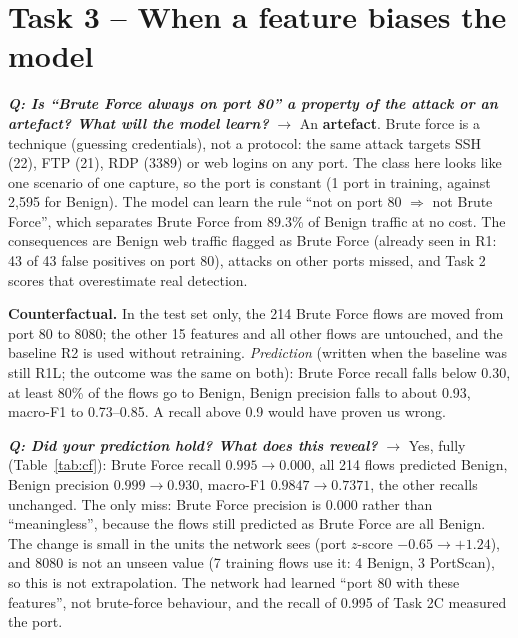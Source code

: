 \documentclass[9pt]{extarticle}
\newcommand{\Q}[1]{\textbf{\emph{Q: #1}}}
\newcommand{\run}[1]{\textsf{#1}}
\begin{document}
\section{Task 3 -- When a feature biases the model}

\Q{Is ``Brute Force always on port 80'' a property of the attack or an artefact? What will the model learn?} $\rightarrow$ An \textbf{artefact}. Brute force is a technique (guessing credentials), not a protocol: the same attack targets SSH (22), FTP (21), RDP (3389) or web logins on any port. The class here looks like one scenario of one capture, so the port is constant (1 port in training, against 2,595 for Benign). The model can learn the rule ``not on port 80 $\Rightarrow$ not Brute Force'', which separates Brute Force from 89.3\% of Benign traffic at no cost. The consequences are Benign web traffic flagged as Brute Force (already seen in \run{R1}: 43 of 43 false positives on port 80), attacks on other ports missed, and Task 2 scores that overestimate real detection.

\textbf{Counterfactual.} In the test set only, the 214 Brute Force flows are moved from port 80 to 8080; the other 15 features and all other flows are untouched, and the baseline \run{R2} is used without retraining. \emph{Prediction} (written when the baseline was still \run{R1L}; the outcome was the same on both): Brute Force recall falls below 0.30, at least 80\% of the flows go to Benign, Benign precision falls to about 0.93, macro-F1 to 0.73--0.85. A recall above 0.9 would have proven us wrong.

\Q{Did your prediction hold? What does this reveal?} $\rightarrow$ Yes, fully (Table~\ref{tab:cf}): Brute Force recall $0.995 \rightarrow \mathbf{0.000}$, all 214 flows predicted Benign, Benign precision $0.999 \rightarrow 0.930$, macro-F1 $0.9847 \rightarrow 0.7371$, the other recalls unchanged. The only miss: Brute Force precision is 0.000 rather than ``meaningless'', because the flows still predicted as Brute Force are all Benign. The change is small in the units the network sees (port $z$-score $-0.65 \rightarrow +1.24$), and 8080 is not an unseen value (7 training flows use it: 4 Benign, 3 PortScan), so this is not extrapolation. The network had learned ``port 80 with these features'', not brute-force behaviour, and the recall of 0.995 of Task 2C measured the port.
\end{document}
